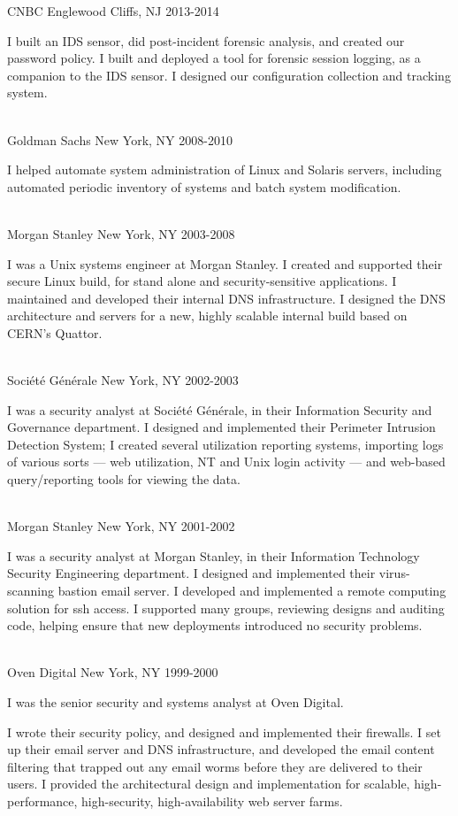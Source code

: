 \documentclass[12pt,letterpaper]{article}
\begin{document}
CNBC \hfill Englewood Cliffs, NJ
2013-2014

I built an IDS sensor, did post-incident forensic analysis, and
created our password policy. I built and deployed a tool for
forensic session logging, as a companion to the IDS sensor. I
designed our configuration collection and tracking system.
\\~

Goldman Sachs \hfill New York, NY
2008-2010

I helped automate system administration of Linux and Solaris
servers, including automated periodic inventory of systems and batch
system modification.
\\~

Morgan Stanley \hfill New York, NY
2003-2008

I was a Unix systems engineer at Morgan Stanley. I created
and supported their secure Linux build, for stand alone and
security-sensitive applications. I maintained and developed their
internal DNS infrastructure. I designed the DNS architecture and
servers for a new, highly scalable internal build based on CERN's
Quattor.
\\~

Soci\'{e}t\'{e} G\'{e}n\'{e}rale \hfill New York, NY
2002-2003

I was a security analyst at Soci\'{e}t\'{e} G\'{e}n\'{e}rale, in
their Information Security and Governance department. I designed and
implemented their Perimeter Intrusion Detection System; I created
several utilization reporting systems, importing logs of various
sorts --- web utilization, NT and Unix login activity --- and
web-based query/reporting tools for viewing the data.
\\~

Morgan Stanley \hfill New York, NY
2001-2002

I was a security analyst at Morgan Stanley, in their Information
Technology Security Engineering department. I designed and
implemented their virus-scanning bastion email server. I developed
and implemented a remote computing solution for ssh access. I
supported many groups, reviewing designs and auditing code,
helping ensure that new deployments introduced no security
problems.
\\~

Oven Digital \hfill New York, NY
1999-2000

I was the senior security and systems analyst at Oven Digital.

I wrote their security policy, and designed and implemented their
firewalls. I set up their email server and DNS infrastructure,
and developed the email content filtering that trapped out
any email worms before they are delivered to their users. I
provided the architectural design and implementation for scalable,
high-performance, high-security, high-availability web server farms.
\\~
\end{document}
